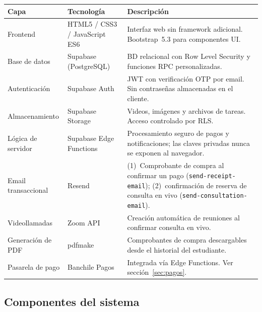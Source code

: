 \documentclass[a4paper,11pt]{article}
\begin{document}
\renewcommand{\arraystretch}{1.3}
\begin{longtable}{L{3.2cm} L{4.5cm} L{7cm}}
\toprule
\textbf{Capa} & \textbf{Tecnolog\'ia} & \textbf{Descripci\'on} \\
\midrule
\endhead
\bottomrule
\endfoot

Frontend &
  HTML5 / CSS3 / JavaScript ES6 &
  Interfaz web sin framework adicional. Bootstrap~5.3 para componentes UI. \\

Base de datos &
  Supabase (PostgreSQL) &
  BD relacional con Row Level Security y funciones RPC personalizadas. \\

Autenticaci\'on &
  Supabase Auth &
  JWT con verificaci\'on OTP por email. Sin contrase\~nas almacenadas en el cliente. \\

Almacenamiento &
  Supabase Storage &
  Videos, im\'agenes y archivos de tareas. Acceso controlado por RLS. \\

L\'ogica de servidor &
  Supabase Edge Functions &
  Procesamiento seguro de pagos y notificaciones; las claves privadas
  nunca se exponen al navegador. \\

Email transaccional &
  Resend &
  (1)~Comprobante de compra al confirmar un pago (\texttt{send-receipt-email});
  (2)~confirmaci\'on de reserva de consulta en vivo (\texttt{send-consultation-email}). \\

Videollamadas &
  Zoom API &
  Creaci\'on autom\'atica de reuniones al confirmar consulta en vivo. \\

Generaci\'on de PDF &
  pdfmake &
  Comprobantes de compra descargables desde el historial del estudiante. \\

Pasarela de pago &
  Banchile Pagos &
  Integrada v\'ia Edge Functions. Ver secci\'on~\ref{sec:pagos}. \\

\end{longtable}

\subsection{Componentes del sistema}
\end{document}
